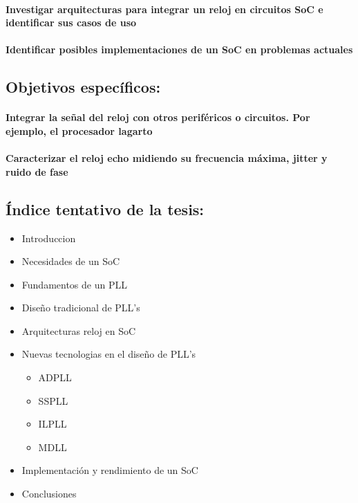 \documentclass[runningheads,a4paper]{llncs}
\begin{document}
\paragraph{Investigar arquitecturas para integrar un reloj en circuitos SoC e identificar sus casos de uso}
\paragraph{Identificar posibles implementaciones de un SoC en problemas actuales}

\subsection{Objetivos específicos:}
\paragraph{Integrar la señal del reloj con otros periféricos o circuitos. Por ejemplo, el procesador lagarto}
\paragraph{Caracterizar el reloj echo midiendo su frecuencia máxima, jitter y ruido de fase}


\subsection{Índice tentativo de la tesis:}
\begin{itemize}
\item Introduccion
\item Necesidades de un SoC
\item Fundamentos de un PLL
\item Diseño tradicional de PLL's
\item Arquitecturas reloj en SoC 
\item Nuevas tecnologias en el diseño de PLL's
\begin{itemize}
    \item ADPLL
    \item SSPLL
    \item ILPLL
    \item MDLL
\end{itemize}
\item Implementación y rendimiento de un SoC
\item Conclusiones
\end{itemize}
\end{document}
